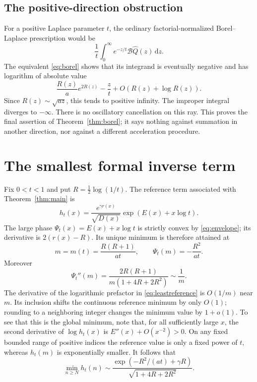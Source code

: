 \documentclass[11pt,a4paper]{article}
\numberwithin{equation}{section}
\theoremstyle{definition}\newtheorem{definition}[theorem]{Definition}
\theoremstyle{remark}\newtheorem{remark}[theorem]{Remark}
\theoremstyle{definition}
\newcommand{\Q}{\widehat Q}
\newcommand{\Bcal}{\mathcal B}
\newcommand{\dd}{\,\mathrm d}
\begin{document}
\subsection{The positive-direction obstruction}
For a positive Laplace parameter \(t\), the ordinary factorial-normalized
Borel--Laplace prescription would be
\[
 \frac1t\int_0^\infty e^{-z/t}\Bcal\Q(z)\dd z.
\]
The equivalent \eqref{eq:borel} shows that its integrand is eventually
negative and has logarithm of absolute value
\[
 \frac{R(z)}a e^{2R(z)}-\frac zt+O(R(z)+\log R(z)).
\]
Since \(R(z)\sim\sqrt{az}\), this tends to positive infinity. The
improper integral diverges to \(-\infty\). There is no oscillatory
cancellation on this ray. This proves the final assertion of
Theorem~\ref{thm:borel}; it says nothing against summation in another
direction, nor against a different acceleration procedure.

\section{The smallest formal inverse term}
\label{sec:least}

Fix \(0<t<1\) and put \(R=\tfrac12\log(1/t)\). The reference term
associated with Theorem~\ref{thm:main} is
\begin{equation}
 h_t(x)=\frac{e^{\gamma r(x)}}{\sqrt{D(x)}}
             \exp(E(x)+x\log t).
 \label{eq:leastreference}
\end{equation}
The large phase \(\Psi_t(x)=E(x)+x\log t\) is strictly convex by
\eqref{eq:envelope}; its derivative is \(2(r(x)-R)\). Its unique minimum
is therefore attained at
\begin{equation}
 m=m(t)=\frac{R(R+1)}{at},\qquad
 \Psi_t(m)=-\frac{R^2}{at}.
 \label{eq:leastm}
\end{equation}
Moreover
\begin{equation}
 \Psi_t''(m)=\frac{2R(R+1)}{m(1+4R+2R^2)}\sim\frac1m.
 \label{eq:leastcurvature}
\end{equation}
The derivative of the logarithmic prefactor in \eqref{eq:leastreference}
is \(O(1/m)\) near \(m\). Its inclusion shifts the continuous reference
minimum by only \(O(1)\); rounding to a neighboring integer changes the
minimum value by \(1+o(1)\). To see that this is the global minimum, note
that, for all sufficiently large \(x\), the second derivative of
\(\log h_t(x)\) is \(E''(x)+O(x^{-2})>0\). On any fixed bounded range
of positive indices the reference value is only a fixed power of \(t\),
whereas \(h_t(m)\) is exponentially smaller. It follows that
\begin{equation}
 \min_{n\ge N}h_t(n)
 \sim\frac{\exp(-R^2/(at)+\gamma R)}{\sqrt{1+4R+2R^2}}.
 \label{eq:referencemin}
\end{equation}
\end{document}
